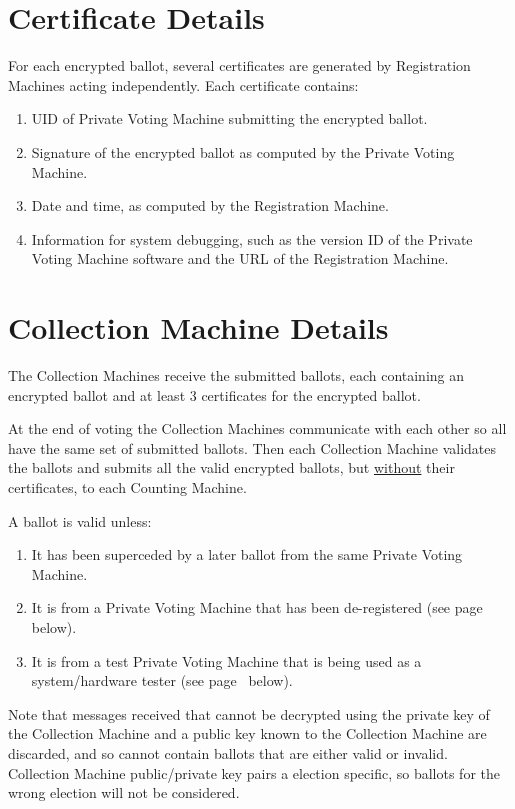 \documentclass[12pt]{article}
\newcommand{\pagref}[1]{(see page~\pageref{#1} below)}
\begin{document}
\section{Certificate Details}

For each encrypted ballot, several certificates are generated
by Registration Machines acting independently.  Each certificate
contains:
\begin{enumerate}
\item UID of Private Voting Machine submitting the encrypted ballot.
\item Signature of the encrypted ballot as computed by the
      Private Voting Machine.
\item Date and time, as computed by the Registration Machine.
\item Information for system debugging, such as the version ID of the
      Private Voting Machine software and the URL of the Registration
      Machine.
\end{enumerate}

\section{Collection Machine Details}

The Collection Machines receive the submitted ballots, each containing
an encrypted ballot and at least 3 certificates for the encrypted
ballot.

At the end of voting the Collection Machines communicate with each
other so all have the same set of submitted ballots.  Then each
Collection Machine validates the ballots and submits all the
valid encrypted ballots, but \underline{without} their certificates, to
each Counting Machine.

A ballot is valid unless:

\begin{enumerate}
\item It has been superceded by a later ballot from the same
Private Voting Machine.
\item It is from a Private Voting Machine that has been de-registered
\pagref{DE-REGISTERED}.
\item It is from a test Private Voting Machine that is
being used as a system/hardware tester \pagref{TESTER}.
\end{enumerate}

Note that messages received that cannot be decrypted using the
private key of the Collection Machine and a public key known
to the Collection Machine are discarded, and so cannot contain
ballots that are either valid or invalid.  Collection Machine
public/private key pairs a election specific, so ballots for
the wrong election will not be considered.
\end{document}

